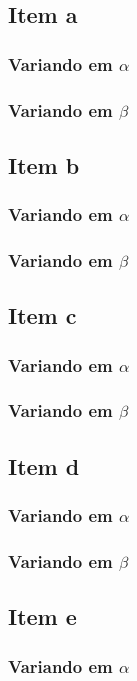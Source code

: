 \documentclass[a4paper, 12pt]{article}
\begin{document}
		\subsection{Item a}
			\subsubsection{Variando em $\alpha$}
			\subsubsection{Variando em $\beta$}
		\subsection{Item b}	
			\subsubsection{Variando em $\alpha$}
			\subsubsection{Variando em $\beta$}			
		\subsection{Item c}		
			\subsubsection{Variando em $\alpha$}
			\subsubsection{Variando em $\beta$}	
		\subsection{Item d}		
			\subsubsection{Variando em $\alpha$}
			\subsubsection{Variando em $\beta$}	
		\subsection{Item e}		
			\subsubsection{Variando em $\alpha$}
\end{document}

